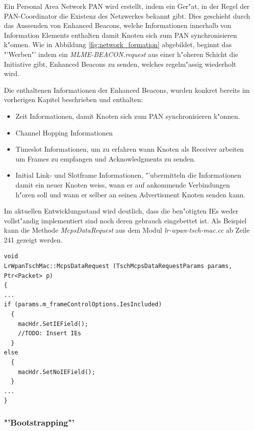 Ein Personal Area Network PAN wird erstellt, indem ein Ger"at, in der Regel
der PAN-Coordinator die Existenz des Netzwerkes bekannt gibt. Dies geschieht
durch das Aussenden von Enhanced Beacons, welche Informationen innerhalb
von Information Elements enthalten
damit Knoten sich zum PAN synchronisieren k"onnen. Wie in Abbildung \ref{fig:network_formation}
abgebildet, beginnt das "'Werben"' indem ein \textit{MLME-BEACON.request} aus
einer h"oheren Schicht die Initiative gibt, Enhanced Beacons zu senden, welches
regelm"assig wiederholt wird.

Die enthaltenen Informationen der Enhanced Beacons, wurden konkret bereits im
vorherigen Kapitel beschrieben und enthalten:

\begin{itemize}
  \item Zeit Informationen, damit Knoten sich zum PAN synchronisieren k"onnen.
  \item Channel Hopping Informationen
  \item Timeslot Informationen, um zu erfahren wann Knoten als Receiver arbeiten
  um Frames zu empfangen und Acknowledgments zu senden.
  \item Initial Link- und Slotframe Informationen, "'ubermitteln die Informationen
  damit ein neuer Knoten weiss, wann er auf ankommende Verbindungen h"oren soll
  und wann er selber an seinen Advertisment Knoten senden kann.

\end{itemize}



Im aktuellen Entwicklungsstand wird deutlich, dass die ben"otigten IEs weder
vollst"andig implementiert sind noch deren gebrauch eingebettet ist. Als Beispiel
kann die Methode \textit{McpsDataRequest} aus dem Modul \textit{lr-wpan-tsch-mac.cc}
ab Zeile 241 gezeigt werden.

\begin{lstlisting}[frame=single]
void
LrWpanTschMac::McpsDataRequest (TschMcpsDataRequestParams params, Ptr<Packet> p)
{
...
if (params.m_frameControlOptions.IesIncluded)
  {
    macHdr.SetIEField();
    //TODO: Insert IEs
  }
else
  {
    macHdr.SetNoIEField();
  }
...
}
\end{lstlisting}

\subsubsection{"'Bootstrapping"'}

